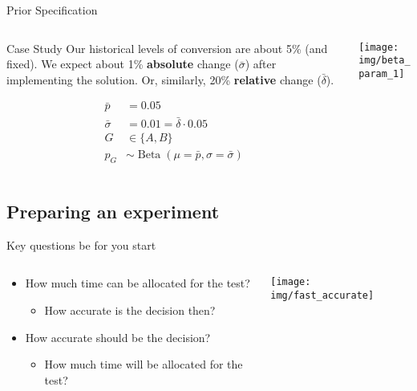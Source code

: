 \documentclass{beamer}
\begin{document}
\begin{frame}{Prior Specification}
\begin{columns}
\begin{column}{0.5\linewidth}
\begin{block}{Case Study}
Our historical levels of conversion are about 5\% (and fixed). We expect about 1\% \textbf{absolute} change ($\bar\sigma$) after implementing the solution. Or, similarly, 20\% \textbf{relative} change ($\bar\delta$).
\end{block}
\begin{align*}
    \bar p &= 0.05\\
    \bar \sigma &= 0.01 = \bar\delta \cdot 0.05\\
    G &\in \{A, B\}\\
    p_G &\sim \operatorname{Beta}(\mu=\bar p, \sigma=\bar\sigma)
\end{align*}
\end{column}
\begin{column}{0.5\linewidth}
\texttt{[image: img/beta\_param\_1]}
\end{column}
\end{columns}
\end{frame}
\subsection{Preparing an experiment}
\begin{frame}{Key questions be for you start}
\begin{columns}
\begin{column}{0.5\linewidth}
\begin{itemize}
        \item How much time can be allocated for the test?
        \begin{itemize}
            \item How accurate is the decision then?
        \end{itemize}
        \item How accurate should be the decision?
        \begin{itemize}
            \item How much time will be allocated for the test?
        \end{itemize}
    \end{itemize}
\end{column}
\begin{column}{0.5\linewidth}
\texttt{[image: img/fast\_accurate]}
\end{column}
\end{columns}
\end{frame}
\end{document}
